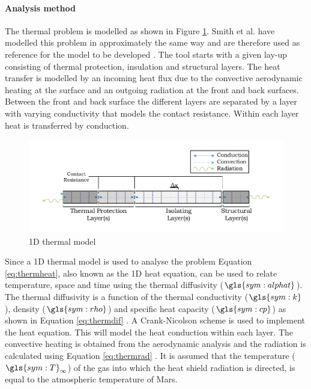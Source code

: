 \paragraph{Analysis method}
The thermal problem is modelled as shown in Figure \ref{fig:1dmodelthermal}. Smith et al. have modelled this problem in approximately the same way and are therefore used as reference for the model to be developed \cite{Smith2011}. The tool starts with a given lay-up consisting of thermal protection, insulation and structural layers. The heat transfer is modelled by an incoming heat flux due to the convective aerodynamic heating at the surface and an outgoing radiation at the front and back surfaces. Between the front and back surface the different layers are separated by a layer with varying conductivity that models the contact resistance. Within each layer heat is transferred by conduction.

\begin{figure}[h]
	\centering
	\includegraphics{./Figure/Thermal/1dmodelthermal.pdf}
	\caption{1D thermal model}
	\label{fig:1dmodelthermal}
\end{figure}

Since a 1D thermal model is used to analyse the problem Equation \ref{eq:thermheat}, also known as the 1D heat equation, can be used to relate temperature, space and time using the thermal diffusivity ($\gls{sym:alphat}$). The thermal diffusivity is a function of the thermal conductivity ($\gls{sym:k}$), density ($\gls{sym:rho}$) and specific heat capacity ($\gls{sym:cp}$) as shown in Equation \ref{eq:thermdif} \cite{Holman2002}. A Crank-Nicolson scheme is used to implement the heat equation. This will model the heat conduction within each layer. The convective heating is obtained from the aerodynamic analysis and the radiation is calculated using Equation \ref{eq:thermrad} \cite{Holman2002}. It is assumed that the temperature ($\gls{sym:T}_\infty$) of the gas into which the heat shield radiation is directed, is equal to the atmospheric temperature of Mars.

